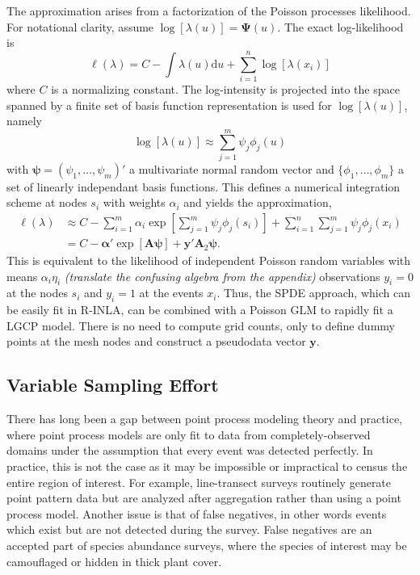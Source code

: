 \documentclass[]{interact}
\begin{document}
The approximation arises from a factorization of the Poisson processes
likelihood. For notational clarity, assume \(\log[\lambda(u)]
= \boldsymbol{\Psi}(u)\). The exact log-likelihood is
\begin{displaymath}
\ell(\lambda) = C - \int \lambda(u) \mathrm{d}u
+ \sum_{i = 1}^{n} \log\left[\lambda(x_{i})\right]
\end{displaymath}
where \(C\) is a normalizing constant. The log-intensity is projected into the
space spanned by a finite set of basis function
representation is used for \(\log[\lambda(u)]\), namely
\begin{displaymath}
\log\left[\lambda(u)\right]
\approx \sum_{j = 1}^{m} \psi_{j} \phi_{j}(u)
\end{displaymath}
with \(\boldsymbol{\psi} = (\psi_{1}, \dots, \psi_{m})'\) a multivariate
normal random vector and \(\{\phi_{1}, \dots, \phi_{m}\}\) a set of linearly
independant basis functions.
This defines a numerical integration scheme at nodes \(s_{i}\)
with weights \(\alpha_{i}\) and yields the approximation,
\begin{align*}
\ell(\lambda) &\approx C - \sum_{i = 1}^{m} \alpha_{i}
\exp\left[\sum_{j = 1}^{m} \psi_{j}\phi_{j}(s_{i})\right]
+ \sum_{i = 1}^{n} \sum_{j = 1}^{m} \psi_{j}\phi_{j}(x_{i}) \\
& = C - \boldsymbol{\alpha}'
\exp\left[\mathbf{A} \boldsymbol{\psi}\right]
+ \mathbf{y}' \mathbf{A}_{2} \boldsymbol{\psi}.
\end{align*}
This is equivalent to the likelihood of independent Poisson random variables
with means \(\alpha_{i} \eta_{i}\) {\it (translate the confusing algebra from
the appendix)} observations \(y_{i} = 0\) at the nodes \(s_{i}\) and
\(y_{i} = 1\) at the events \(x_{i}\). Thus, the SPDE approach, which can be
easily fit in R-INLA, can be combined with a Poisson GLM to rapidly fit a LGCP
model. There is no need to compute grid counts, only to define dummy points at
the mesh nodes and construct a pseudodata vector \(\mathbf{y}\).



\subsection{Variable Sampling Effort}
\label{veffort}

There has long been a gap between point process modeling theory and practice,
where point process models are only fit to data from completely-observed
domains under the assumption that every event was detected perfectly. In
practice, this is not the case as it may be impossible or impractical to census
the entire region of interest. For example, line-transect surveys routinely
generate point pattern data but are analyzed after aggregation rather than
using a point process model. Another issue is that of false negatives, in other
words events which exist but are not detected during the survey. False
negatives are an accepted part of species abundance surveys, where the species
of interest may be camouflaged or hidden in thick plant cover.
\end{document}
